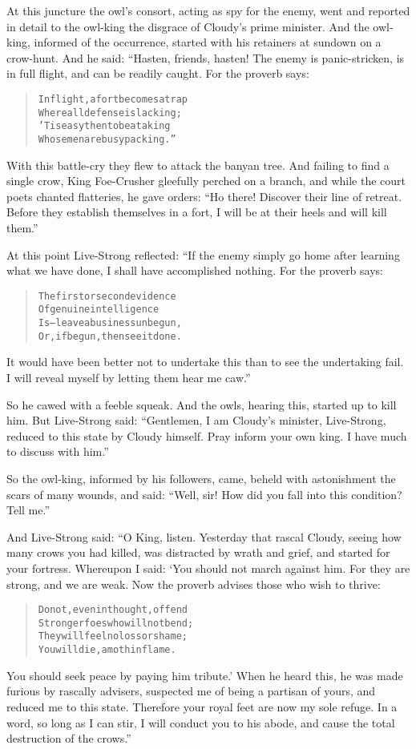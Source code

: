 \documentclass[article, twoside, 14pt]{memoir}
\renewenvironment{verbatim}{%
\begin{quote}%
\vskip -10pt%
\begin{alltt}\normalfont\large}{\end{alltt}%
\end{quote}%
\vskip -10pt
} %
\begin{document}
At this juncture the owl's consort, acting as spy for the enemy,
went and reported in detail to the owl-king the disgrace of
Cloudy's prime minister. And the owl-king, informed of the
occurrence, started with his retainers at sundown on a crow-hunt.
And he said: “Hasten, friends, hasten! The enemy is panic-stricken,
is in full flight, and can be readily caught. For the proverb
says:

\begin{verbatim}
In flight, a fort becomes a trap
    Where all defense is lacking;
'Tis easy then to beat a king
    Whose men are busy packing.”
\end{verbatim}
With this battle-cry they flew to attack the banyan tree. And
failing to find a single crow, King Foe-Crusher gleefully perched
on a branch, and while the court poets chanted flatteries, he gave
orders:
``Ho there! Discover their line of retreat. Before they establish themselves in a fort, I will be at their heels and will kill them.''

At this point Live-Strong reflected: “If the enemy simply go home
after learning what we have done, I shall have accomplished
nothing. For the proverb says:

\begin{verbatim}
The first or second evidence
Of genuine intelligence
Is--leave a business unbegun,
Or, if begun, then see it done.
\end{verbatim}
It would have been better not to undertake this than to see the
undertaking fail. I will reveal myself by letting them hear me
caw.”

So he cawed with a feeble squeak. And the owls, hearing this,
started up to kill him. But Live-Strong said:
``Gentlemen, I am Cloudy's minister, Live-Strong, reduced to this state by Cloudy himself. Pray inform your own king. I have much to discuss with him.''

So the owl-king, informed by his followers, came, beheld with
astonishment the scars of many wounds, and said:
``Well, sir! How did you fall into this condition? Tell me.''

And Live-Strong said: “O King, listen. Yesterday that rascal
Cloudy, seeing how many crows you had killed, was distracted by
wrath and grief, and started for your fortress. Whereupon I said:
‘You should not march against him. For they are strong, and we are
weak. Now the proverb advises those who wish to thrive:

\begin{verbatim}
Do not, even in thought, offend
Stronger foes who will not bend;
They will feel no loss or shame;
You will die, a moth in flame.
\end{verbatim}
You should seek peace by paying him tribute.' When he heard this,
he was made furious by rascally advisers, suspected me of being a
partisan of yours, and reduced me to this state. Therefore your
royal feet are now my sole refuge. In a word, so long as I can
stir, I will conduct you to his abode, and cause the total
destruction of the crows.”
\end{document}
